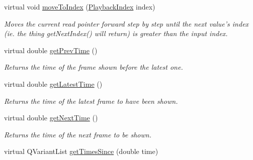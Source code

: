 \begin{DoxyCompactItemize}
virtual void \hyperlink{class_picto_1_1_frame_state_af81303f5e09d827fbcf1db0c2485ffef}{move\-To\-Index} (\hyperlink{struct_picto_1_1_playback_index}{Playback\-Index} index)
\begin{DoxyCompactList}\small\item\em Moves the current read pointer forward step by step until the next value's index (ie. the thing get\-Next\-Index() will return) is greater than the input index. \end{DoxyCompactList}\item 
\hypertarget{class_picto_1_1_frame_state_ab726881a579be21ec4eff2c34ee55cab}{virtual double \hyperlink{class_picto_1_1_frame_state_ab726881a579be21ec4eff2c34ee55cab}{get\-Prev\-Time} ()}\label{class_picto_1_1_frame_state_ab726881a579be21ec4eff2c34ee55cab}

\begin{DoxyCompactList}\small\item\em Returns the time of the frame shown before the latest one. \end{DoxyCompactList}\item 
\hypertarget{class_picto_1_1_frame_state_a1b909faaae966b598a2fec26e6a8eb5a}{virtual double \hyperlink{class_picto_1_1_frame_state_a1b909faaae966b598a2fec26e6a8eb5a}{get\-Latest\-Time} ()}\label{class_picto_1_1_frame_state_a1b909faaae966b598a2fec26e6a8eb5a}

\begin{DoxyCompactList}\small\item\em Returns the time of the latest frame to have been shown. \end{DoxyCompactList}\item 
\hypertarget{class_picto_1_1_frame_state_a15cf5140e3715af5132874bdb770bb1b}{virtual double \hyperlink{class_picto_1_1_frame_state_a15cf5140e3715af5132874bdb770bb1b}{get\-Next\-Time} ()}\label{class_picto_1_1_frame_state_a15cf5140e3715af5132874bdb770bb1b}

\begin{DoxyCompactList}\small\item\em Returns the time of the next frame to be shown. \end{DoxyCompactList}\item 
\hypertarget{class_picto_1_1_frame_state_ac2caeac98106aab6e0ffb10949ce209d}{virtual Q\-Variant\-List \hyperlink{class_picto_1_1_frame_state_ac2caeac98106aab6e0ffb10949ce209d}{get\-Times\-Since} (double time)}\label{class_picto_1_1_frame_state_ac2caeac98106aab6e0ffb10949ce209d}


\end{DoxyCompactItemize}
